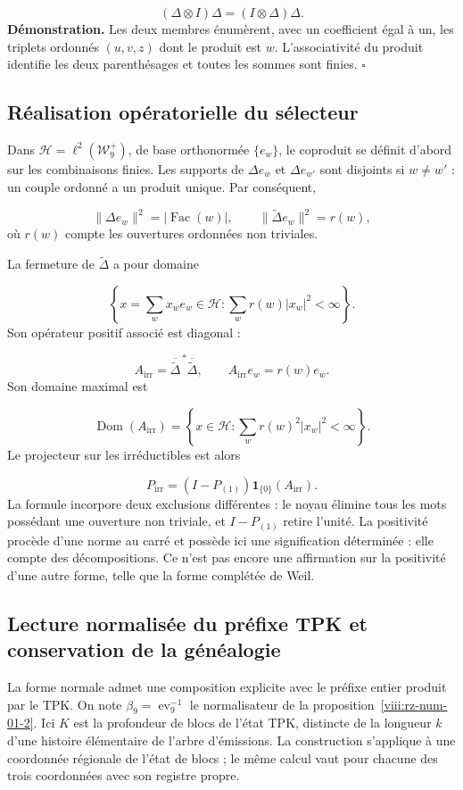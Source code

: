 \[
(\Delta\otimes I)\Delta=(I\otimes\Delta)\Delta.
\]
\textbf{Démonstration.} Les deux membres énumèrent, avec un coefficient égal à un, les triplets ordonnés $(u,v,z)$ dont le produit est $w$. L'associativité du produit identifie les deux parenthésages et toutes les sommes sont finies. \hfill\(\square\)

\subsection{Réalisation opératorielle du sélecteur}
Dans \(\mathcal H=\ell^2(\mathcal W_9^+)\), de base orthonormée \(\{e_w\}\), le coproduit se définit d’abord sur les combinaisons finies. Les supports de $\Delta e_w$ et $\Delta e_{w'}$ sont disjoints si $w\ne w'$ : un couple ordonné a un produit unique. Par conséquent,

\[
\|\Delta e_w\|^2=|\operatorname{Fac}(w)|,
\qquad
\|\widetilde\Delta e_w\|^2=r(w),
\]
où $r(w)$ compte les ouvertures ordonnées non triviales.

La fermeture de $\widetilde\Delta$ a pour domaine

\[
\left\{x=\sum_wx_we_w\in\mathcal H:\sum_wr(w)|x_w|^2<\infty\right\}.
\]
Son opérateur positif associé est diagonal :

\[
A_{\mathrm{irr}}=\overline{\widetilde\Delta}^{\,*}\overline{\widetilde\Delta},
\qquad A_{\mathrm{irr}}e_w=r(w)e_w.
\]
Son domaine maximal est

\[
\operatorname{Dom}(A_{\mathrm{irr}})
=\left\{x\in\mathcal H:\sum_wr(w)^2|x_w|^2<\infty\right\}.
\]
Le projecteur sur les irréductibles est alors

\[
P_{\mathrm{irr}}=(I-P_{(1)})\mathbf1_{\{0\}}(A_{\mathrm{irr}}).
\]
La formule incorpore deux exclusions différentes : le noyau élimine tous les mots possédant une ouverture non triviale, et $I-P_{(1)}$ retire l'unité. La positivité procède d'une norme au carré et possède ici une signification déterminée : elle compte des décompositions. Ce n'est pas encore une affirmation sur la positivité d'une autre forme, telle que la forme complétée de Weil.

\subsection{Lecture normalisée du préfixe TPK et conservation de la généalogie}
La forme normale admet une composition explicite avec le préfixe entier produit par le TPK. On note \(\beta_9=\operatorname{ev}_9^{-1}\) le normalisateur de la proposition~\ref{viii:rz-num-01-2}. Ici \(K\) est la profondeur de blocs de l’état TPK, distincte de la longueur \(k\) d’une histoire élémentaire de l’arbre d’émissions. La construction s’applique à une coordonnée régionale de l’état de blocs ; le même calcul vaut pour chacune des trois coordonnées avec son registre propre.

